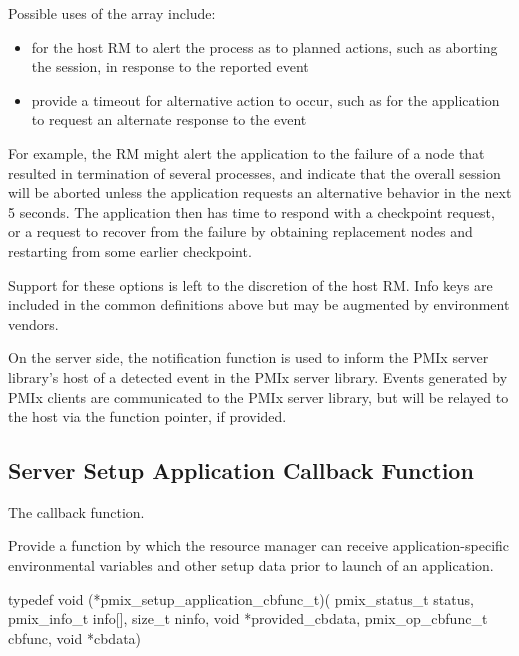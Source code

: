 \adviceuserstart
Possible uses of the  array include:

\begin{itemize}
\item for the host \ac{RM} to alert the process as to planned actions, such as aborting the session, in response to the reported event

\item provide a timeout for alternative action to occur, such as for the application to request an alternate response to the event
\end{itemize}

For example, the \ac{RM} might alert the application to the failure of a node that resulted in termination of several processes, and indicate that the overall session will be aborted unless the application requests an alternative behavior in the next 5 seconds. The application then has time to respond with a checkpoint request, or a request to recover from the failure by obtaining replacement nodes and restarting from some earlier checkpoint.

Support for these options is left to the discretion of the host \ac{RM}. Info keys are included in the common definitions above but may be augmented by environment vendors.
\adviceuserend

\advicermstart
On the server side, the notification function is used to inform the \ac{PMIx} server library's host of a detected event in the \ac{PMIx} server library. Events generated by \ac{PMIx} clients are communicated to the \ac{PMIx} server library, but will be relayed to the host via the  function pointer, if provided.
\advicermend

\subsection{Server Setup Application Callback Function}

The  callback function.

\summary

Provide a function by which the resource manager can receive application-specific environmental variables and other setup data prior to launch of an application.

\format

\cspecificstart
\begin{codepar}
typedef void (*pmix_setup_application_cbfunc_t)(
                        pmix_status_t status,
                        pmix_info_t info[], size_t ninfo,
                        void *provided_cbdata,
                        pmix_op_cbfunc_t cbfunc, void *cbdata)
\end{codepar}
\cspecificend

